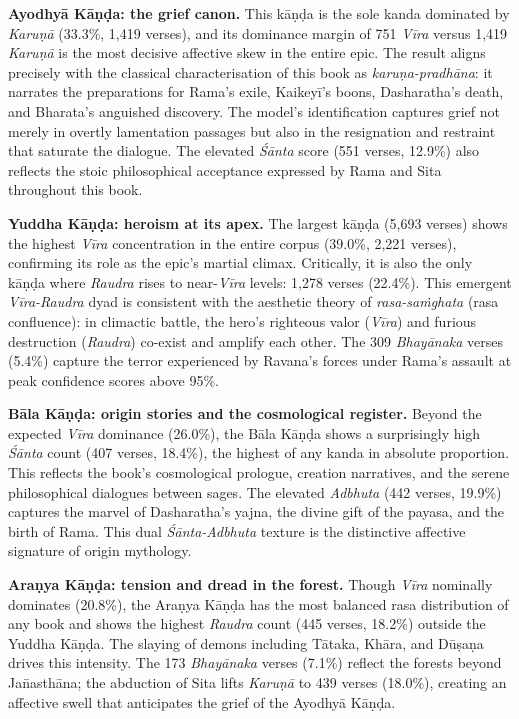\documentclass[11pt]{article}
\begin{document}
\textbf{Ayodhy\=a K\=a\d n\d da: the grief canon.} This k\=a\d n\d da is the sole kanda dominated by \textit{Karu\d n\=a} (33.3\%, 1,419 verses), and its dominance margin of 751 \textit{V\=ira} versus 1,419 \textit{Karu\d n\=a} is the most decisive affective skew in the entire epic. The result aligns precisely with the classical characterisation of this book as \textit{karu\d na-pradh\=ana}: it narrates the preparations for Rama's exile, Kaikey\=i's boons, Dasharatha's death, and Bharata's anguished discovery. The model's identification captures grief not merely in overtly lamentation passages but also in the resignation and restraint that saturate the dialogue. The elevated \textit{Ś\=anta} score (551 verses, 12.9\%) also reflects the stoic philosophical acceptance expressed by Rama and Sita throughout this book.

\textbf{Yuddha K\=a\d n\d da: heroism at its apex.} The largest k\=a\d n\d da (5,693 verses) shows the highest \textit{V\=ira} concentration in the entire corpus (39.0\%, 2,221 verses), confirming its role as the epic's martial climax. Critically, it is also the only k\=a\d n\d da where \textit{Raudra} rises to near-\textit{V\=ira} levels: 1,278 verses (22.4\%). This emergent \textit{V\=ira-Raudra} dyad is consistent with the aesthetic theory of \textit{rasa-sa\.mghata} (rasa confluence): in climactic battle, the hero's righteous valor (\textit{V\=ira}) and furious destruction (\textit{Raudra}) co-exist and amplify each other. The 309 \textit{Bhay\=anaka} verses (5.4\%) capture the terror experienced by Ravana's forces under Rama's assault at peak confidence scores above 95\%.

\textbf{B\=ala K\=a\d n\d da: origin stories and the cosmological register.} Beyond the expected \textit{V\=ira} dominance (26.0\%), the B\=ala K\=a\d n\d da shows a surprisingly high \textit{Ś\=anta} count (407 verses, 18.4\%), the highest of any kanda in absolute proportion. This reflects the book's cosmological prologue, creation narratives, and the serene philosophical dialogues between sages. The elevated \textit{Adbhuta} (442 verses, 19.9\%) captures the marvel of Dasharatha's yajna, the divine gift of the payasa, and the birth of Rama. This dual \textit{Ś\=anta-Adbhuta} texture is the distinctive affective signature of origin mythology.

\textbf{Ara\d nya K\=a\d n\d da: tension and dread in the forest.} Though \textit{V\=ira} nominally dominates (20.8\%), the Ara\d nya K\=a\d n\d da has the most balanced rasa distribution of any book and shows the highest \textit{Raudra} count (445 verses, 18.2\%) outside the Yuddha K\=a\d n\d da. The slaying of demons including T\=ataka, Kh\=ara, and D\=u\d sa\d na drives this intensity. The 173 \textit{Bhay\=anaka} verses (7.1\%) reflect the forests beyond Ja\=nasth\=ana; the abduction of Sita lifts \textit{Karu\d n\=a} to 439 verses (18.0\%), creating an affective swell that anticipates the grief of the Ayodhy\=a K\=a\d n\d da.
\end{document}
